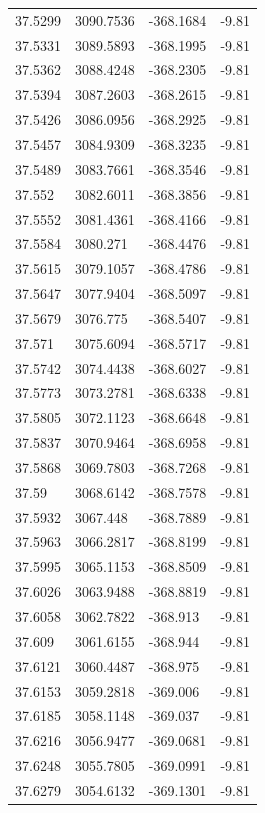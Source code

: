 \begin{table}[H]
\begin{tabular}{llll}
37.5299 & 3090.7536 & -368.1684 & -9.81 \\
37.5331 & 3089.5893 & -368.1995 & -9.81 \\
37.5362 & 3088.4248 & -368.2305 & -9.81 \\
37.5394 & 3087.2603 & -368.2615 & -9.81 \\
37.5426 & 3086.0956 & -368.2925 & -9.81 \\
37.5457 & 3084.9309 & -368.3235 & -9.81 \\
37.5489 & 3083.7661 & -368.3546 & -9.81 \\
37.552 & 3082.6011 & -368.3856 & -9.81 \\
37.5552 & 3081.4361 & -368.4166 & -9.81 \\
37.5584 & 3080.271 & -368.4476 & -9.81 \\
37.5615 & 3079.1057 & -368.4786 & -9.81 \\
37.5647 & 3077.9404 & -368.5097 & -9.81 \\
37.5679 & 3076.775 & -368.5407 & -9.81 \\
37.571 & 3075.6094 & -368.5717 & -9.81 \\
37.5742 & 3074.4438 & -368.6027 & -9.81 \\
37.5773 & 3073.2781 & -368.6338 & -9.81 \\
37.5805 & 3072.1123 & -368.6648 & -9.81 \\
37.5837 & 3070.9464 & -368.6958 & -9.81 \\
37.5868 & 3069.7803 & -368.7268 & -9.81 \\
37.59 & 3068.6142 & -368.7578 & -9.81 \\
37.5932 & 3067.448 & -368.7889 & -9.81 \\
37.5963 & 3066.2817 & -368.8199 & -9.81 \\
37.5995 & 3065.1153 & -368.8509 & -9.81 \\
37.6026 & 3063.9488 & -368.8819 & -9.81 \\
37.6058 & 3062.7822 & -368.913 & -9.81 \\
37.609 & 3061.6155 & -368.944 & -9.81 \\
37.6121 & 3060.4487 & -368.975 & -9.81 \\
37.6153 & 3059.2818 & -369.006 & -9.81 \\
37.6185 & 3058.1148 & -369.037 & -9.81 \\
37.6216 & 3056.9477 & -369.0681 & -9.81 \\
37.6248 & 3055.7805 & -369.0991 & -9.81 \\
37.6279 & 3054.6132 & -369.1301 & -9.81 \\

\end{tabular}
\end{table}
